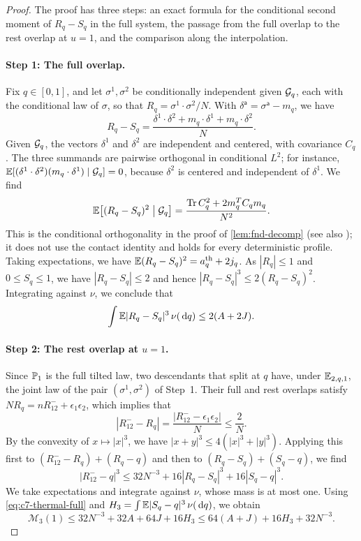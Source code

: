 \begin{proof}
The proof has three steps: an exact formula for the conditional second
moment of $R_q-S_q$ in the full system, the passage from the full
overlap to the rest overlap at $u=1$, and the comparison along the
interpolation.

\paragraph{Step 1: The full overlap.} Fix $q\in[0,1]$, and let
$\sigma^1,\sigma^2$ be conditionally independent given $\mathcal G_q$, each
with the conditional law of $\sigma$, so that
$R_q=\sigma^1\cdot\sigma^2/N$. With $\delta^{\mathsf a}=\sigma^{\mathsf
a}-m_q$, we have
\[
 R_q-S_q=\frac{\delta^1\cdot\delta^2+m_q\cdot\delta^1+m_q\cdot\delta^2}N.
\]
Given $\mathcal G_q$, the vectors $\delta^1$ and $\delta^2$ are independent
and centered, with covariance $C_q$. The three summands are pairwise
orthogonal in conditional $L^2$; for instance,
$\mathbb E[(\delta^1\cdot\delta^2)(m_q\cdot\delta^1)\mid\mathcal G_q]=0$, because
$\delta^2$ is centered and independent of $\delta^1$. We find
\[
 \mathbb E\bigl[(R_q-S_q)^2\bigm|\mathcal G_q\bigr]
 =\frac{\operatorname{Tr} C_q^2+2m_q^TC_qm_q}{N^2}.
\]
This is the conditional orthogonality in the proof of
\cref{lem:fnd-decomp} (see also \cite[Section~2.5, before (2.17)]{AL});
it does not use the contact identity and holds for every deterministic
profile. Taking expectations, we have
$\mathbb E(R_q-S_q)^2=a^{\rm th}_q+2j_q$. As $|R_q|\le1$ and $0\le S_q\le1$, we
have $|R_q-S_q|\le2$ and hence $|R_q-S_q|^3\le2(R_q-S_q)^2$. Integrating
against $\nu$, we conclude that
\begin{equation}\label{eq:c7-thermal-full}
 \int\mathbb E|R_q-S_q|^3\,\nu(\,\mathrm d q)\le2(A+2J).
\end{equation}

\paragraph{Step 2: The rest overlap at $u=1$.} Since $\mathbb P_1$ is the full
tilted law, two descendants that split at $q$ have, under
$\mathbb E_{2,q,1}$, the joint law of the pair $(\sigma^1,\sigma^2)$ of
Step~1. Their full and rest overlaps satisfy
$NR_q=nR^-_{12}+\epsilon_1\epsilon_2$, which implies that
\[
 |R^-_{12}-R_q|=\frac{|R^-_{12}-\epsilon_1\epsilon_2|}N\le\frac2N .
\]
By the convexity of $x\mapsto|x|^3$, we have
$|x+y|^3\le4(|x|^3+|y|^3)$. Applying this first to
$(R^-_{12}-R_q)+(R_q-q)$ and then to $(R_q-S_q)+(S_q-q)$, we find
\[
 |R^-_{12}-q|^3\le32N^{-3}+16|R_q-S_q|^3+16|S_q-q|^3 .
\]
We take expectations and integrate against $\nu$, whose mass is at most
one. Using \eqref{eq:c7-thermal-full} and
$H_3=\int\mathbb E|S_q-q|^3\,\nu(\,\mathrm d q)$, we obtain
\[
 \mathcal M_3(1)\le32N^{-3}+32A+64J+16H_3
 \le64(A+J)+16H_3+32N^{-3}.
\]


\end{proof}
